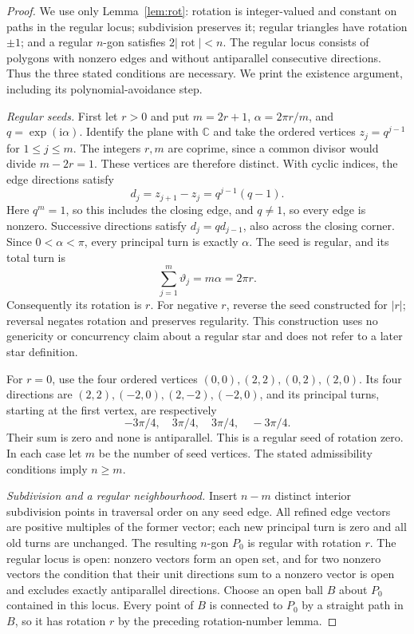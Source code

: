 \begin{proof}
We use only Lemma~\ref{lem:rot}: rotation is
integer-valued and constant on paths in the regular locus; subdivision
preserves it; regular triangles have rotation $\pm1$; and a regular
$n$-gon satisfies $2|\operatorname{rot}|<n$. The regular locus consists
of polygons with nonzero edges and without antiparallel consecutive
directions. Thus the three stated conditions are necessary. We print
the existence argument, including its polynomial-avoidance step.

\emph{Regular seeds.}
First let $r>0$ and put $m=2r+1$, $\alpha=2\pi r/m$, and
$q=\exp(\mathrm i\alpha)$. Identify the plane with $\mathbb C$ and take
the ordered vertices $z_j=q^{j-1}$ for $1\leq j\leq m$.
The integers $r,m$ are coprime, since a common divisor would divide
$m-2r=1$. These vertices are therefore distinct. With cyclic indices,
the edge directions satisfy
\begin{equation}\label{fibpr:directions}
d_j=z_{j+1}-z_j=q^{j-1}(q-1).
\end{equation}
Here $q^m=1$, so this includes the closing edge, and $q\ne1$, so every
edge is nonzero. Successive directions satisfy $d_j=q d_{j-1}$, also
across the closing corner. Since $0<\alpha<\pi$, every principal turn
is exactly $\alpha$. The seed is regular, and its total turn is
\begin{equation}\label{fibpr:rotation}
\sum_{j=1}^{m}\vartheta_j=m\alpha=2\pi r.
\end{equation}
Consequently its rotation is $r$. For negative $r$, reverse the seed
constructed for $|r|$; reversal negates rotation and preserves regularity.
This construction uses no genericity or concurrency claim about a
regular star and does not refer to a later star definition.

For $r=0$, use the four ordered vertices
$(0,0),(2,2),(0,2),(2,0)$. Its four directions are
$(2,2),(-2,0),(2,-2),(-2,0)$, and its principal turns, starting at the
first vertex, are respectively
\begin{equation}\label{fibpr:bowtie}
-3\pi/4,\quad 3\pi/4,\quad 3\pi/4,\quad-3\pi/4.
\end{equation}
Their sum is zero and none is antiparallel. This is a regular seed of
rotation zero. In each case let $m$ be the number of seed vertices.
The stated admissibility conditions imply $n\geq m$.

\emph{Subdivision and a regular neighbourhood.}
Insert $n-m$ distinct interior subdivision points in traversal order
on any seed edge. All refined edge vectors are positive multiples of
the former vector; each new principal turn is zero and all old turns
are unchanged. The resulting $n$-gon $P_0$ is regular with rotation $r$.
The regular locus is open: nonzero vectors form an open set, and for
two nonzero vectors the condition that their unit directions sum to a
nonzero vector is open and excludes exactly antiparallel directions.
Choose an open ball $B$ about $P_0$ contained in this locus.
Every point of $B$ is connected to $P_0$ by a straight path in $B$,
so it has rotation $r$ by the preceding rotation-number lemma.


\end{proof}

